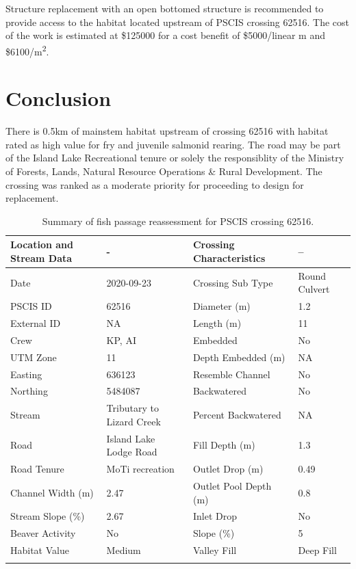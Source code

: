 \documentclass[
]{book}
\begin{document}
Structure replacement with an open bottomed structure is recommended to provide access to the habitat located upstream of PSCIS crossing 62516. The cost of the work is estimated at \$125000 for a cost benefit of \$5000/linear m and \$6100/m\textsuperscript{2}.

\hypertarget{conclusion-6}{%
\section*{Conclusion}\label{conclusion-6}}

There is 0.5km of mainstem habitat upstream of crossing 62516 with habitat rated as high value for fry and juvenile salmonid rearing. The road may be part of the Island Lake Recreational tenure or solely the responsiblity of the Ministry of Forests, Lands, Natural Resource Operations \& Rural Development. The crossing was ranked as a moderate priority for proceeding to design for replacement.

\begin{table}

\caption{\label{tab:tab-culvert-040}Summary of fish passage reassessment for PSCIS crossing 62516.}
\centering
\fontsize{11}{13}\selectfont
\begin{tabu} to 
\toprule
Location and Stream Data & - & Crossing Characteristics & --\\
\midrule
Date & 2020-09-23 & Crossing Sub Type & Round Culvert\\
PSCIS ID & 62516 & Diameter (m) & 1.2\\
External ID & NA & Length (m) & 11\\
Crew & KP, AI & Embedded & No\\
UTM Zone & 11 & Depth Embedded (m) & NA\\
\addlinespace
Easting & 636123 & Resemble Channel & No\\
Northing & 5484087 & Backwatered & No\\
Stream & Tributary to Lizard Creek & Percent Backwatered & NA\\
Road & Island Lake Lodge Road & Fill Depth (m) & 1.3\\
Road Tenure & MoTi recreation & Outlet Drop (m) & 0.49\\
\addlinespace
Channel Width (m) & 2.47 & Outlet Pool Depth (m) & 0.8\\
Stream Slope (\%) & 2.67 & Inlet Drop & No\\
Beaver Activity & No & Slope (\%) & 5\\
Habitat Value & Medium & Valley Fill & Deep Fill\\
\bottomrule
{}\\
\end{tabu}
\end{table}
\end{document}
